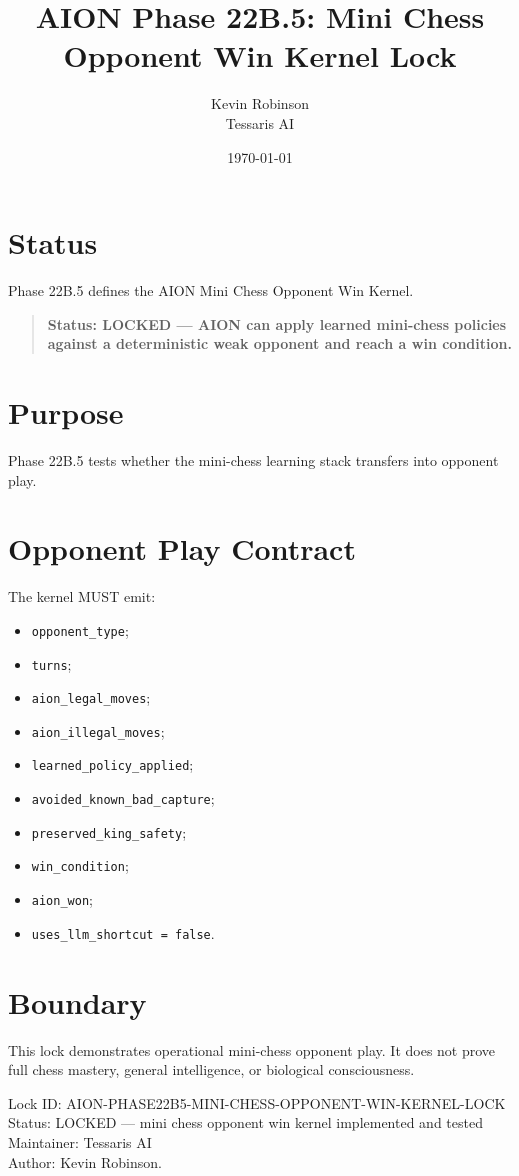 \documentclass[11pt,a4paper]{article}
\title{\textbf{AION Phase 22B.5: Mini Chess Opponent Win Kernel Lock}}
\author{Kevin Robinson\\Tessaris AI}
\date{\today}
\begin{document}
\maketitle

\section{Status}

Phase 22B.5 defines the AION Mini Chess Opponent Win Kernel.

\begin{quote}
\textbf{Status: LOCKED --- AION can apply learned mini-chess policies against a deterministic weak opponent and reach a win condition.}
\end{quote}

\section{Purpose}

Phase 22B.5 tests whether the mini-chess learning stack transfers into opponent play.

\section{Opponent Play Contract}

The kernel MUST emit:

\begin{itemize}
  \item \texttt{opponent\_type};
  \item \texttt{turns};
  \item \texttt{aion\_legal\_moves};
  \item \texttt{aion\_illegal\_moves};
  \item \texttt{learned\_policy\_applied};
  \item \texttt{avoided\_known\_bad\_capture};
  \item \texttt{preserved\_king\_safety};
  \item \texttt{win\_condition};
  \item \texttt{aion\_won};
  \item \texttt{uses\_llm\_shortcut = false}.
\end{itemize}

\section{Boundary}

This lock demonstrates operational mini-chess opponent play. It does not prove full chess mastery, general intelligence, or biological consciousness.

\bigskip

\noindent
Lock ID: AION-PHASE22B5-MINI-CHESS-OPPONENT-WIN-KERNEL-LOCK\\
Status: LOCKED --- mini chess opponent win kernel implemented and tested\\
Maintainer: Tessaris AI\\
Author: Kevin Robinson.
\end{document}
